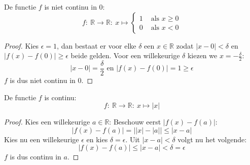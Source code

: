 \documentclass[main.tex]{subfiles}
\begin{document}

\begin{tvb}
  De functie $f$ is niet continu in $0$:
  \[
  f:\ \mathbb{R} \rightarrow \mathbb{R}:\ x\mapsto 
  \left\{
    \begin{array}{cl}
      1 & \text{ als } x \ge 0\\
      0 & \text{ als } x < 0
    \end{array}
  \right.
  \]

  \begin{proof}
    Kies $\epsilon = 1$, dan bestaat er voor elke $\delta$ een $x\in \mathbb{R}$ zodat $|x-0|<\delta$ en $|f(x)-f(0)|\ge \epsilon$ beide gelden.
    Voor een willekeurige $\delta$ kiezen we $x = -\frac{\delta}{2}$:
    \[ |x-0| = \frac{\delta}{2} \text{ en } |f(x)-f(0)| = 1 \ge \epsilon \]
    $f$ is dus niet continu in $0$.
  \end{proof}
\end{tvb}


\begin{vb}
  De functie $f$ is continu:
  \[ f:\ \mathbb{R} \rightarrow \mathbb{R}:\ x \mapsto |x| \]

  \begin{proof}
    Kies een willekeurige $a\in \mathbb{R}$:
    Beschouw eerst $|f(x)-f(a)|$:
    \[ |f(x)-f(a)| = \left||x|-|a|\right| \le |x-a| \]
    Kies nu een willekeurige $\epsilon$ en kies $\delta = \epsilon$.
    Uit $|x-a| <\delta$ volgt nu het volgende:
    \[ |f(x)-f(a)| \le |x-a| < \delta = \epsilon \]
    $f$ is dus continu in $a$.
  \end{proof}
\end{vb}
\end{document}

